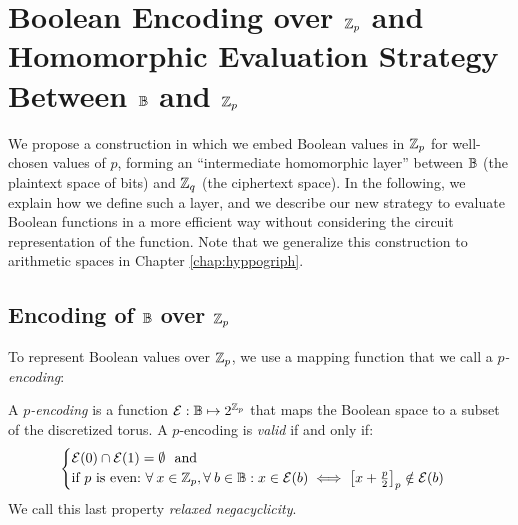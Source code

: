 \section{Boolean Encoding over $\mathbb{Z}_p$ and Homomorphic Evaluation Strategy Between $\mathbb{B}$ and $\mathbb{Z}_p$}
\label{sec:p_encodings_homorphic_layer}



We propose a construction in which we embed Boolean values in $\mathbb{Z}_p$ for well-chosen values of $p$, forming an ``intermediate homomorphic layer'' between $\mathbb{B}$ (the plaintext space of bits) and $\mathbb{Z}_q$ (the ciphertext space). In the following, we explain how we define such a layer, and we describe our new strategy to evaluate Boolean functions in a more efficient way without considering the circuit representation of the function. Note that we generalize this construction to arithmetic spaces in Chapter \ref{chap:hyppogriph}.


\subsection{Encoding of $\mathbb{B}$ over $\mathbb{Z}_p$}

To represent Boolean values over $\mathbb{Z}_p$, we use a mapping function that we call a \emph{$p$-encoding}:

\begin{definition}[$p$-encoding]
    A \emph{$p$-encoding} is a function $\mathcal{E}: \mathbb{B} \mapsto 2^{\mathbb{Z}_p}$ that maps the Boolean space to a subset of the discretized torus. A $p$-encoding is \emph{valid} if and only if:
    \begin{equation}
        \begin{cases}
            \mathcal{E}(0) \cap \mathcal{E}(1) = \emptyset~\text{ and}\\
            \text{if $p$ is even:} ~\forall \:x \in \mathbb Z_p, \forall \:b \in \mathbb{B}: x \in \mathcal{E}(b) \iff \left [ x + \frac p 2 \right ]_p \notin \mathcal{E}(b)
        \end{cases}
    \label{def:validity}
    \end{equation}
    We call this last property \emph{relaxed negacyclicity}.
    \label{def:encoding}
\end{definition}



